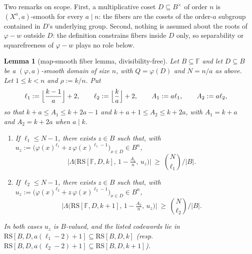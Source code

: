\documentclass[11pt]{article}
\newtheorem{lemma}[theorem]{Lemma}
\theoremstyle{definition}
\theoremstyle{remark}
\newcommand{\F}{\mathbb{F}}
\newcommand{\B}{B}
\newcommand{\RS}{\mathrm{RS}}
\newcommand{\Lst}{\Lambda}
\begin{document}
Two remarks on scope. First, a multiplicative coset $D\subseteq\B^\times$ of order $n$ is $(X^a,a)$-smooth for every $a\mid n$: the fibers are the cosets of the order-$a$ subgroup contained in $D$'s underlying group. Second, nothing is assumed about the roots of $\varphi-w$ outside $D$: the definition constrains fibers inside $D$ only, so separability or squarefreeness of $\varphi-w$ plays no role below.

\begin{lemma}[map-smooth fiber lemma, divisibility-free]\label{lem:phi-fiber}
Let $\B\subseteq\F$ and let $D\subseteq\B$ be a $(\varphi,a)$-smooth domain of size $n$, with $Q=\varphi(D)$ and $N=n/a$ as above. Let $1\le k<n$ and $\rho:=k/n$. Put
\[
\ell_1:=\Bigl\lfloor\frac{k-1}a\Bigr\rfloor+2,\qquad
\ell_2:=\Bigl\lfloor\frac{k}a\Bigr\rfloor+2,\qquad
A_1:=a\ell_1,\qquad A_2:=a\ell_2,
\]
so that $k+a\le A_1\le k+2a-1$ and $k+a+1\le A_2\le k+2a$, with $A_1=k+a$ and $A_2=k+2a$ when $a\mid k$.
\begin{enumerate}[label=\textup{(\roman*)}]
\item If $\ell_1\le N-1$, there exists $z\in\B$ such that, with $u_z:=\bigl(\varphi(x)^{\ell_1}+z\,\varphi(x)^{\ell_1-1}\bigr)_{x\in D}\in\B^n$,
\[
\bigl|\Lst\bigl(\RS[\F,D,k],\,1-\tfrac{A_1}n,\,u_z\bigr)\bigr|\ \ge\ \binom N{\ell_1}\Big/|\B| .
\]
\item If $\ell_2\le N-1$, there exists $z\in\B$ such that, with $u_z:=\bigl(\varphi(x)^{\ell_2}+z\,\varphi(x)^{\ell_2-1}\bigr)_{x\in D}\in\B^n$,
\[
\bigl|\Lst\bigl(\RS[\F,D,k+1],\,1-\tfrac{A_2}n,\,u_z\bigr)\bigr|\ \ge\ \binom N{\ell_2}\Big/|\B| .
\]
\end{enumerate}
In both cases $u_z$ is $\B$-valued, and the listed codewords lie in $\RS[\B,D,a(\ell_1-2)+1]\subseteq\RS[\B,D,k]$ \textup(resp.\ $\RS[\B,D,a(\ell_2-2)+1]\subseteq\RS[\B,D,k+1]$\textup).
\end{lemma}
\end{document}
